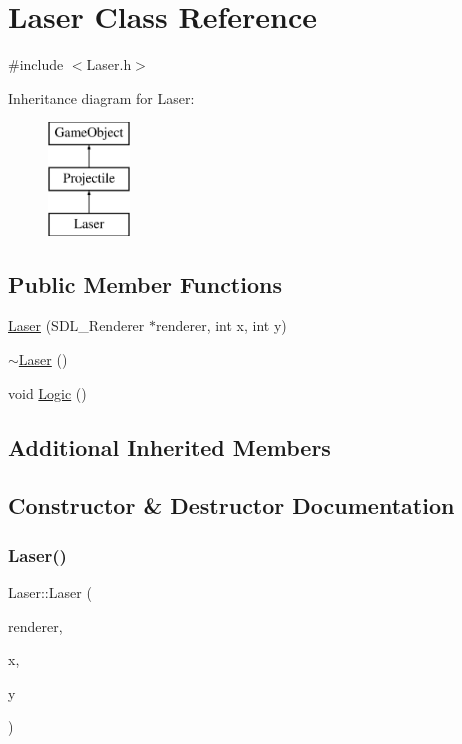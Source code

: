 \hypertarget{class_laser}{}\section{Laser Class Reference}
\label{class_laser}


{\ttfamily \#include $<$Laser.\+h$>$}

Inheritance diagram for Laser\+:\begin{figure}[H]
\begin{center}
\leavevmode
\includegraphics[height=3.000000cm]{class_laser}
\end{center}
\end{figure}
\subsection*{Public Member Functions}
\begin{DoxyCompactItemize}
\item 
\mbox{\hyperlink{class_laser_ac799230b67fc870ae9699efcf4ef27cb}{Laser}} (S\+D\+L\+\_\+\+Renderer $\ast$renderer, int x, int y)
\item 
\mbox{\hyperlink{class_laser_aa9baee5ed9775426e0b1d563c4687711}{$\sim$\+Laser}} ()
\item 
void \mbox{\hyperlink{class_laser_a1f2135281ecc1b318357633f4e7dd34c}{Logic}} ()
\end{DoxyCompactItemize}
\subsection*{Additional Inherited Members}


\subsection{Constructor \& Destructor Documentation}
\mbox{\label{class_laser_ac799230b67fc870ae9699efcf4ef27cb}} 
\subsubsection{\texorpdfstring{Laser()}{Laser()}}
{\footnotesize\ttfamily Laser\+::\+Laser (\begin{DoxyParamCaption}\item[{S\+D\+L\+\_\+\+Renderer $\ast$}]{renderer,  }\item[{int}]{x,  }\item[{int}]{y }\end{DoxyParamCaption})}

